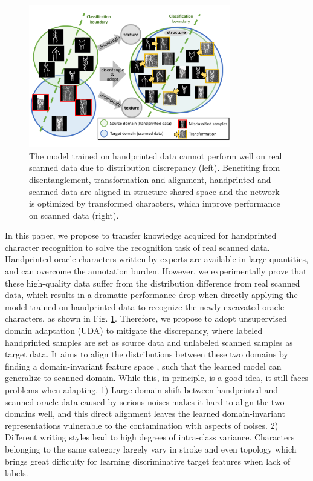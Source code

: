 \documentclass[10pt,journal,compsoc,twocolumn ]{IEEEtran}
\begin{document}
\begin{figure}
\centering
\includegraphics[width=8.8cm]{DA_fig.pdf}
\caption{The model trained on handprinted data cannot perform well on real scanned data due to distribution discrepancy (left). Benefiting from disentanglement, transformation and alignment, handprinted and scanned data are aligned in structure-shared space and the network is optimized by transformed characters, which improve performance on scanned data (right).}
\label{simple_arch} %
\end{figure}

In this paper, we propose to transfer knowledge acquired for handprinted character recognition to solve the recognition task of real scanned data. Handprinted oracle characters written by experts are available in large quantities, and can overcome the annotation burden. %
However, we experimentally prove that these high-quality data suffer from the distribution difference from real scanned data, which results in a dramatic performance drop when directly applying the model trained on handprinted data to recognize the newly excavated oracle characters, as shown in Fig. \ref{simple_arch}. %
Therefore, we propose to adopt unsupervised domain adaptation (UDA) \cite{wang2018deep} to mitigate the discrepancy, where labeled handprinted samples are set as source data and unlabeled scanned samples as target data. It aims to align the distributions between these two domains by finding a domain-invariant feature space \cite{Ganin2015Unsupervised,Long2015Learning,Long2016Unsupervised}, such that the learned model can generalize to scanned domain. While this, in principle, is a good idea, it still faces problems when adapting. %
1) Large domain shift between handprinted and scanned oracle data caused by serious noises makes it hard to align the two domains well, and this direct alignment leaves the learned domain-invariant representations vulnerable to the contamination with aspects of noises. 2) Different writing styles lead to high degrees of intra-class variance. Characters belonging to the same category largely vary in stroke and even topology which brings great difficulty for learning discriminative target features when lack of labels. %
\end{document}
